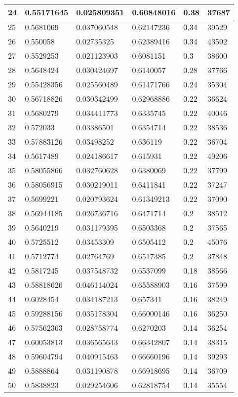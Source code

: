 \begin{longtable}{|l|l|l|l|l|l|}
24 & 0.55171645 & 0.025809351 & 0.60848016 & 0.38 & 37687 \\ \hline 
25 & 0.5681069 & 0.037060548 & 0.62147236 & 0.34 & 39529 \\ \hline 
26 & 0.550058 & 0.02735325 & 0.62389416 & 0.34 & 43592 \\ \hline 
27 & 0.5529253 & 0.021123903 & 0.6081151 & 0.3 & 38600 \\ \hline 
28 & 0.5648424 & 0.030424697 & 0.6140057 & 0.28 & 37766 \\ \hline 
29 & 0.55428356 & 0.025560489 & 0.61471766 & 0.24 & 35304 \\ \hline 
30 & 0.56718826 & 0.030342499 & 0.62968886 & 0.22 & 36624 \\ \hline 
31 & 0.5680279 & 0.034411773 & 0.6335745 & 0.22 & 40046 \\ \hline 
32 & 0.572033 & 0.03386501 & 0.6354714 & 0.22 & 38536 \\ \hline 
33 & 0.57883126 & 0.03498252 & 0.636119 & 0.22 & 36704 \\ \hline 
34 & 0.5617489 & 0.024186617 & 0.615931 & 0.22 & 49206 \\ \hline 
35 & 0.58055866 & 0.032760628 & 0.6380069 & 0.22 & 37799 \\ \hline 
36 & 0.58056915 & 0.030219011 & 0.6411841 & 0.22 & 37247 \\ \hline 
37 & 0.5699221 & 0.020793624 & 0.61349213 & 0.22 & 37090 \\ \hline 
38 & 0.56944185 & 0.026736716 & 0.6471714 & 0.2 & 38512 \\ \hline 
39 & 0.5640219 & 0.031179395 & 0.6503368 & 0.2 & 37565 \\ \hline 
40 & 0.5725512 & 0.03453309 & 0.6505412 & 0.2 & 45076 \\ \hline 
41 & 0.5712774 & 0.02764769 & 0.6517385 & 0.2 & 37848 \\ \hline 
42 & 0.5817245 & 0.037548732 & 0.6537099 & 0.18 & 38566 \\ \hline 
43 & 0.58818626 & 0.046114024 & 0.65588903 & 0.16 & 37599 \\ \hline 
44 & 0.6028454 & 0.034187213 & 0.657341 & 0.16 & 38249 \\ \hline 
45 & 0.59288156 & 0.035178304 & 0.66000146 & 0.16 & 36250 \\ \hline 
46 & 0.57562363 & 0.028758774 & 0.6270203 & 0.14 & 36254 \\ \hline 
47 & 0.60053813 & 0.036565643 & 0.66342807 & 0.14 & 38315 \\ \hline 
48 & 0.59604794 & 0.040915463 & 0.66660196 & 0.14 & 39293 \\ \hline 
49 & 0.5888864 & 0.031190878 & 0.66918695 & 0.14 & 36709 \\ \hline 
50 & 0.5838823 & 0.029254606 & 0.62818754 & 0.14 & 35554 \\ \hline 
\end{longtable}